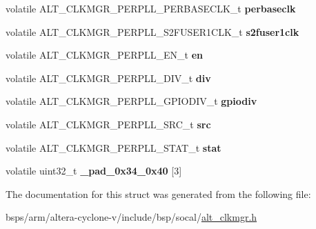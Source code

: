 \begin{DoxyCompactItemize}
\mbox{\label{structALT__CLKMGR__PERPLL__s_ad9cb038138dc54dd54622506b0534bc3}} 
volatile A\+L\+T\+\_\+\+C\+L\+K\+M\+G\+R\+\_\+\+P\+E\+R\+P\+L\+L\+\_\+\+P\+E\+R\+B\+A\+S\+E\+C\+L\+K\+\_\+t {\bfseries perbaseclk}
\item 
\mbox{\label{structALT__CLKMGR__PERPLL__s_ad5e7cb849959d1c829a7e4243fe2f827}} 
volatile A\+L\+T\+\_\+\+C\+L\+K\+M\+G\+R\+\_\+\+P\+E\+R\+P\+L\+L\+\_\+\+S2\+F\+U\+S\+E\+R1\+C\+L\+K\+\_\+t {\bfseries s2fuser1clk}
\item 
\mbox{\label{structALT__CLKMGR__PERPLL__s_ab27d3a4e4669b374ca4bd838973fad1e}} 
volatile A\+L\+T\+\_\+\+C\+L\+K\+M\+G\+R\+\_\+\+P\+E\+R\+P\+L\+L\+\_\+\+E\+N\+\_\+t {\bfseries en}
\item 
\mbox{\label{structALT__CLKMGR__PERPLL__s_a4f3acf1251eb973f37becf96fd868853}} 
volatile A\+L\+T\+\_\+\+C\+L\+K\+M\+G\+R\+\_\+\+P\+E\+R\+P\+L\+L\+\_\+\+D\+I\+V\+\_\+t {\bfseries div}
\item 
\mbox{\label{structALT__CLKMGR__PERPLL__s_aba623f6bc5d9171e50485f145af56431}} 
volatile A\+L\+T\+\_\+\+C\+L\+K\+M\+G\+R\+\_\+\+P\+E\+R\+P\+L\+L\+\_\+\+G\+P\+I\+O\+D\+I\+V\+\_\+t {\bfseries gpiodiv}
\item 
\mbox{\label{structALT__CLKMGR__PERPLL__s_ae04e9df35dcfb7592a50c5fd74abc2dc}} 
volatile A\+L\+T\+\_\+\+C\+L\+K\+M\+G\+R\+\_\+\+P\+E\+R\+P\+L\+L\+\_\+\+S\+R\+C\+\_\+t {\bfseries src}
\item 
\mbox{\label{structALT__CLKMGR__PERPLL__s_a16a157a478405b25e8cebaddca50c329}} 
volatile A\+L\+T\+\_\+\+C\+L\+K\+M\+G\+R\+\_\+\+P\+E\+R\+P\+L\+L\+\_\+\+S\+T\+A\+T\+\_\+t {\bfseries stat}
\item 
\mbox{\label{structALT__CLKMGR__PERPLL__s_ab1a5b88107c315b464290e4f290379d9}} 
volatile uint32\+\_\+t {\bfseries \+\_\+pad\+\_\+0x34\+\_\+0x40} \mbox{[}3\mbox{]}
\end{DoxyCompactItemize}


The documentation for this struct was generated from the following file\+:\begin{DoxyCompactItemize}
\item 
bsps/arm/altera-\/cyclone-\/v/include/bsp/socal/\mbox{\hyperlink{alt__clkmgr_8h}{alt\+\_\+clkmgr.\+h}}\end{DoxyCompactItemize}
